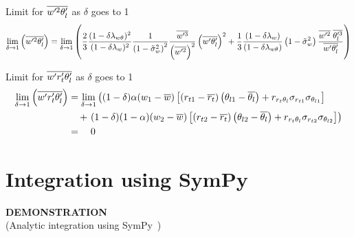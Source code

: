 \documentclass[10pt]{beamer}
\numberwithin{equation}{section}
\begin{document}
    \begin{frame}{Limit for \texorpdfstring{$\overline{w'^2 \theta_l'}$}{wprimethetaltwobar} as \texorpdfstring{$\delta$}{delta} goes to 1}
        \begin{align}
            \label{eq:limit_wprimethetalprime2bar_delta_to_1}
            \lim_{\delta \to 1}\left(\overline{w'^2 \theta_l'}\right)
            = \lim_{\delta \to 1}
            \left(
            \frac{2}{3}
            \frac{(1-\delta \lambda_{w \theta})^2}{(1-\delta \lambda_w)^2}
            \frac{1}{\left( 1 - \tilde{\sigma}_w^2 \right)^2}
            \frac{\overline{w'^3}}{\left(\overline{w'^2} \right)^2}
            \left(\overline{w' \theta_l'} \right)^2
            +
            \frac{1}{3}
            \frac{(1-\delta \lambda_w)}{(1-\delta \lambda_{w \theta})}
            \left( 1 - \tilde{\sigma}_w^2 \right)
            \frac{\overline{w'^2} \; \overline{\theta_l'^3}}{\overline{w' \theta_l'}}
            \right)
        \end{align}
    \end{frame}

    \begin{frame}{Limit for \texorpdfstring{$\overline{w' r_t' \theta_l'}$}{wprimertprimethetalbar} as \texorpdfstring{$\delta$}{delta} goes to 1}
        \begin{align}
            \label{eq:limit_wprimertprimethetalbar_delta_to_1}
            \lim_{\delta \to 1}\left(\overline{w' r_t' \theta_l'}\right)
            &= \lim_{\delta \to 1}
            \left(
            (1 - \delta) \alpha (w_1 - \overline{w}) \left[
                \left(r_{t1} - \overline{r_t}\right)
                \left(\theta_{l1} - \overline{\theta_l}\right) +
                r_{r_t \theta_l} \sigma_{r_{t1}} \sigma_{\theta_{l1}}
                \right] \right.\nonumber\\
            &\quad+ \left.(1 - \delta) (1 - \alpha) (w_2 - \overline{w}) \left[
                \left(r_{t2} - \overline{r_t}\right)
                \left(\theta_{l2} - \overline{\theta_l}\right) +
                r_{r_t \theta_l} \sigma_{r_{t2}} \sigma_{\theta_{l2}}
                \right]
            \right) \nonumber\\
            &=\quad 0
        \end{align}
    \end{frame}


    \section{Integration using SymPy}\label{sec:integration-using-sympy}

    \begin{frame}
        \begin{center}
            \textbf{DEMONSTRATION} \\
            (Analytic integration using SymPy~\autocite{10.7717/peerj-cs.103})
        \end{center}
    \end{frame}
\end{document}
